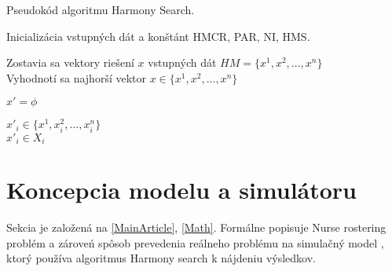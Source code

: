 \documentclass[a4paper, 14pt]{article}
\begin{document}
\begin{algorithm}[H]
\caption{Pseudokód algoritmu Harmony Search.}
\label{alg1}
\SetNlSty{}{}{:} 
\SetNlSkip{-1.2em}
\SetInd{1em}{1em}

\BlankLine
{}
\BlankLine
\Indp \Indp
	Inicializácia vstupných dát a konštánt HMCR, PAR, NI, HMS.\\
\BlankLine

\Indm \Indm
{}
\BlankLine
\Indp \Indp
	Zostavia sa vektory riešení $x$ vstupných dát $HM = \{x^1,x^2,..., x^n\}$\\
	Vyhodnotí sa najhorší vektor $x \in  \{x^1,x^2,..., x^n\}$\\
\BlankLine

\Indm \Indm
{}
\BlankLine
\Indp \Indp
	$x' = \phi$\\
    {
    	
    	{
			$x'_i \in  \{x^1,x_i^2,..., x_i^n\}$\\
		}			
		{
			$x'_i \in  X_i$\\
							    			
		}
		
    }
\BlankLine

\Indm \Indm
{}
\BlankLine
\Indp \Indp
\BlankLine

\Indm \Indm
{}
\BlankLine
\Indp \Indp
\BlankLine
\end{algorithm}



\section{Koncepcia modelu a simulátoru}
Sekcia je založená na \ref{MainArticle}, \ref{Math}. Formálne popisuje Nurse rostering problém a zároveń spôsob prevedenia reálneho problému na simulačný model \cite{Peringer}, ktorý používa algoritmus Harmony search k nájdeniu výsledkov.
\end{document}
